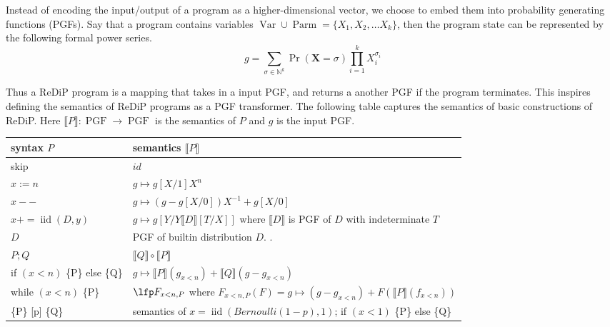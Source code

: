 \documentclass[a4paper]{article}
\DeclareMathOperator*{\PGF}{PGF}
\DeclareMathOperator*{\VARS}{Var}
\DeclareMathOperator*{\PARMS}{Parm}
\DeclareMathOperator*{\iid}{iid}
\renewcommand{\S}[1]{ \llbracket #1 \rrbracket }
\begin{document}
Instead of encoding the input/output of a program as a higher-dimensional vector, we choose to embed them into probability generating functions (PGFs).
Say that a program contains variables \(\VARS\cup\PARMS = \{X_1,X_2,\ldots X_k\}\), then the program state can be represented by the following formal power series.
\[
	g = \sum_{\sigma\in \mathbb{N}^{k}} \Pr(\mathbf{X} = \sigma)\prod_{i=1}^k X_i^{\sigma_i}
\]

Thus a ReDiP program is a mapping that takes in a input PGF, and returns a another PGF if the program terminates.
This inspires defining the semantics of ReDiP programs as a PGF transformer.
The following table captures the semantics of basic constructions of ReDiP. Here \(\S{P}: \PGF\to\PGF\) is the semantics of \(P\) and \(g\) is the input PGF.\par

\begin{center}
	\begin{tabular}{ll}
		\hline
		syntax \(P\)                  & semantics \(\S{P}\)                                                                    \\
		\hline
		skip                          & \(id\)                                                                                 \\
		\(x := n\)                    & \(g\mapsto g[X/1]X^n\)                                                                 \\
		\(x --\)                      & \(g\mapsto (g-g[X/0])X^{-1} + g[X/0]\)                                                 \\
		\(x += \iid(D, y)\)           & \(g\mapsto g[Y/Y\S{D}[T/X]]\) where \(\S{D}\) is PGF of \(D\) with indeterminate \(T\) \\
		\(D\)                         & PGF of builtin distribution \(D\). .                                                   \\
		\(P;Q\)                       & \(\S{Q} \circ \S{P}\)                                                                  \\
		if \((x<n)\) \{P\} else \{Q\} & \(g\mapsto \S{P}(g_{x<n}) + \S{Q}(g-g_{x<n})\)                                         \\
		while \((x<n)\) \{P\}         & \(\lfp F_{x<n,P}\) where \(F_{x<n,P}(F)=g\mapsto (g-g_{x<n}) + F(\S{P}(f_{x<n})) \)    \\
		\{P\} [p] \{Q\}               & semantics of \(x = \iid(Bernoulli(1-p),1)\); if \((x<1)\) \{P\} else \{Q\}             \\
		\hline
	\end{tabular}
\end{center}
\end{document}
